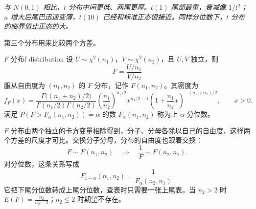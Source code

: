 \begin{center}
\begin{minipage}{\linewidth}
\centering
{}
\par\vspace{2pt}
{\footnotesize\itshape 与 $N(0,1)$ 相比，$t$ 分布中间更低、两尾更厚。$t(1)$ 尾部最重，衰减像 $1/t^2$；$n$ 增大后尾巴迅速变薄，$t(10)$ 已经和标准正态很接近。同样分位数下，$t$ 分布的临界值比正态的大。}
\end{minipage}
\end{center}

第三个分布用来比较两个方差。

\begin{mydef}{$F$ 分布}{f distribution}
    设 $U\sim\chi^2(n_1)$，$V\sim\chi^2(n_2)$，且 $U,V$ 独立，则
    \[
        F=\frac{U/n_1}{V/n_2}
    \]
    服从自由度为 $(n_1,n_2)$ 的 $F$ 分布，记作 $F(n_1,n_2)$。其密度为
    \[
        f_F(x)=\frac{\Gamma\bigl((n_1+n_2)/2\bigr)}
        {\Gamma(n_1/2)\Gamma(n_2/2)}
        \left(\frac{n_1}{n_2}\right)^{n_1/2}
        x^{n_1/2-1}
        \left(1+\frac{n_1}{n_2}x\right)^{-(n_1+n_2)/2},
        \qquad x>0.
    \]
    满足 $P(F>F_{\alpha}(n_1,n_2))=\alpha$ 的数 $F_{\alpha}(n_1,n_2)$ 称为上 $\alpha$ 分位数。
\end{mydef}

$F$ 分布由两个独立的卡方变量相除得到，分子、分母各除以自己的自由度，这样两个方差的尺度才可比。交换分子分母，分布的自由度也跟着交换：
\[
    F\sim F(n_1,n_2)\quad\Longrightarrow\quad \frac{1}{F}\sim F(n_2,n_1).
\]
对分位数，这条关系写成
\[
    F_{1-\alpha}(n_1,n_2)=\frac{1}{F_{\alpha}(n_2,n_1)}.
\]
它把下尾分位数转成上尾分位数，查表时只需要一张上尾表。当 $n_2>2$ 时 $E(F)=\frac{n_2}{n_2-2}$；$n_2\le2$ 时期望不存在。

